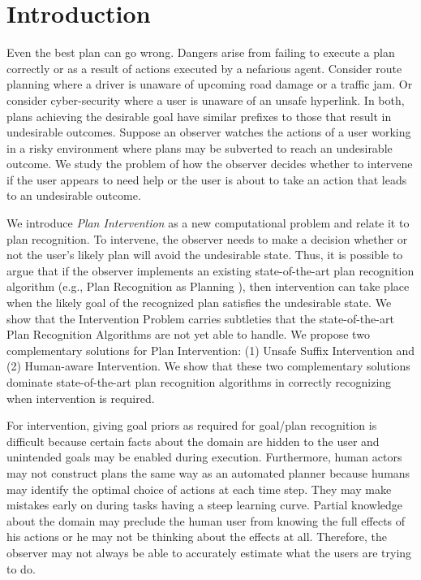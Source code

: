 \section{Introduction}
\noindent Even the best plan can go wrong. 
Dangers arise from failing to execute a plan correctly or as a result of actions executed by a nefarious agent. 
Consider route planning where a driver is unaware of upcoming road damage or a traffic jam. 
Or consider cyber-security where a user is unaware of an unsafe hyperlink. 
In both, plans achieving the desirable goal have similar prefixes to those that result in undesirable outcomes.
Suppose an observer watches the actions of a user working in a risky environment where plans may be subverted to reach an undesirable outcome. 
We study the problem of how the observer decides whether to intervene if the user appears to need help or the user is about to take an action that leads to an undesirable outcome.

We introduce \textit{Plan Intervention} as a new computational problem and relate it to plan recognition. 
To intervene, the observer needs to make a decision whether or not the user's likely plan will avoid the undesirable state. 
Thus, it is possible to argue that if the observer implements an existing state-of-the-art plan recognition algorithm (e.g., Plan Recognition as Planning \cite{ramirez2009plan}), then intervention can take place when the likely goal of the recognized plan satisfies the undesirable state. 
We show that the Intervention Problem carries subtleties that the state-of-the-art Plan Recognition Algorithms are not yet able to handle.
We propose two complementary solutions for Plan Intervention: (1) Unsafe Suffix Intervention and (2) Human-aware Intervention. 
We show that these two complementary solutions dominate state-of-the-art plan recognition algorithms in correctly recognizing when intervention is required.

For intervention, giving goal priors as required for goal/plan recognition is difficult because certain facts about the domain are hidden to the user and unintended goals may be enabled during execution. 
Furthermore, human actors may not construct plans the same way as an automated planner because humans may identify the optimal choice of actions at each time step. 
They may  make mistakes early on during tasks having a steep learning curve. 
Partial knowledge about the domain may preclude the human user from knowing the full effects of his actions or he may not be thinking about the effects at all. 
Therefore, the observer may not always be able to accurately estimate what the users are trying to do.

